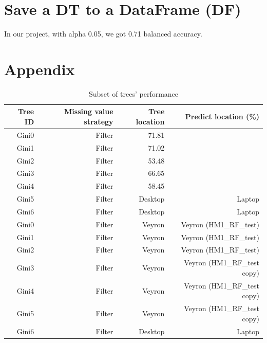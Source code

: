 \documentclass{article}
\begin{document}
\section{Save a DT to a DataFrame (DF)}



In our project, with alpha 0.05, we got 0.71 balanced accuracy. 



\section{Appendix}

\begin{table}[H]
    \centering        
    \begin{tabular}{r|r|r|r}
        Tree ID  & Missing value strategy & Tree location & Predict location (\%)\\\hline
        Gini0 & Filter &71.81\\
        Gini1 & Filter &71.02\\
        Gini2 & Filter &53.48\\
        Gini3 & Filter & 66.65\\
        Gini4 & Filter & 58.45\\
        Gini5 & Filter & Desktop & Laptop\\
        Gini6 & Filter & Desktop & Laptop\\
        Gini0 & Filter & Veyron & Veyron (HM1_RF_test)\\
        Gini1 & Filter & Veyron & Veyron (HM1_RF_test)\\
        Gini2 & Filter & Veyron & Veyron (HM1_RF_test)\\
        Gini3 & Filter & Veyron & Veyron (HM1_RF_test copy)\\
        Gini4 & Filter & Veyron & Veyron (HM1_RF_test copy)\\
        Gini5 & Filter & Veyron & Veyron (HM1_RF_test copy)\\
        Gini6 & Filter & Desktop & Laptop\\
        
        
    \end{tabular}
    \caption{Subset of trees' performance}
\end{table}
\end{document}
